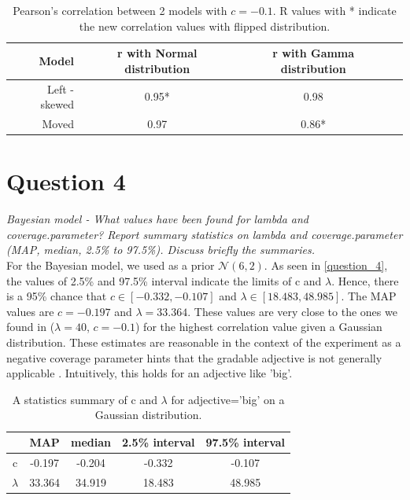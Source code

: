 \documentclass[11pt,a4paper,oneside]{article}
\begin{document}
\begin{table}[ht]
\centering
\begin{tabular}{rccr}
  \hline
 Model & r with Normal distribution & r with Gamma distribution\\ 
  \hline
    Left - skewed & 0.95* & 0.98 \\ 
    Moved & 0.97 & 0.86* \\ 
   \hline
\end{tabular}
\caption{Pearson's correlation between 2 models with $c = -0.1$. R values with * indicate the new correlation values with flipped distribution.}
\label{question_3_flipped}
\end{table}

\section{Question 4} 
\label{Question 4}
\textit{Bayesian model - What values have been found for lambda and coverage.parameter? Report summary statistics on lambda and coverage.parameter (MAP, median, 2.5\% to 97.5\%). Discuss briefly the summaries.}\\

For the Bayesian model, we used as a prior $\mathcal{N}(6, 2)$. As seen in \autoref{question_4},  the values of 2.5\% and 97.5\% interval indicate the limits of c and $\lambda$. Hence, there is a 95\% chance that $ c \in [-0.332, -0.107]$ and $\lambda \in [18.483, 48.985]$. The MAP values are $c = -0.197$ and $\lambda = 33.364$. These values are very close to the ones we found in  ($\lambda = 40$, $c = -0.1$) for the highest correlation value given a Gaussian distribution. These estimates are reasonable in the context of the experiment as a negative coverage parameter hints that the gradable adjective is not generally applicable \cite{qing_MeaningUseGradable_2014}. Intuitively, this holds for an adjective like 'big'.


\begin{table}[ht]
\centering
\begin{tabular}{ccccc}
  \hline
  & MAP & median & 2.5\% interval & 97.5\% interval\\ 
  \hline
    c & -0.197 & -0.204 & -0.332 & -0.107\\ 
    $\lambda$ & 33.364 & 34.919 & 18.483 & 48.985\\ 
   \hline
\end{tabular}
\caption{A statistics summary of c and $\lambda$ for adjective='big' on a Gaussian distribution.}
\label{question_4}
\end{table}
\end{document}
